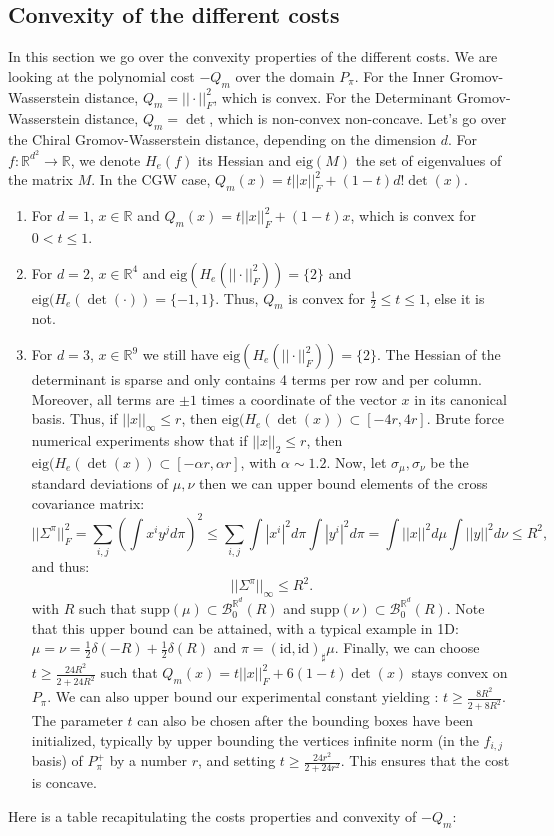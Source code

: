 \documentclass{article}
\newcommand{\R}{\mathbb{R}}
\newcommand{\B}{\mathcal{B}}
\newcommand{\1}{\mathbf{1}}
\newcommand{\eig}{\mathrm{eig}}
\theoremstyle{definition}
\theoremstyle{remark}
\begin{document}
\begin{appendices}
\section{Convexity of the different costs}\label{sec:supp_cost_convexity}
In this section we go over the convexity properties of the different costs. We are looking at the polynomial cost $-Q_m$ over the domain $P_\pi$. For the Inner Gromov-Wasserstein distance, $Q_m =||\cdot||^2_F $, which is convex. For the Determinant Gromov-Wasserstein distance, $Q_m =\det $, which is non-convex non-concave. Let's go over the Chiral Gromov-Wasserstein distance, depending on the dimension $d$. For $f:\R^{d^2}\to\R$, we denote $H_e(f)$ its Hessian and $\eig(M)$ the set of eigenvalues of the matrix $M$. In the CGW case, $Q_m(x) = t||x||^2_F + (1-t) d! \det(x)$.
\begin{enumerate}
    \item For $d=1$, $x\in \R$ and $Q_m(x) = t||x||^2_F + (1-t) x$, which is convex for $0<t\leq1$.
    \item For $d=2$, $x\in \R^4$ and  $\eig(H_e(||\cdot||^2_F))=\{2\}$ and $\eig(H_e(\det(\cdot))=\{-1,1\}$. Thus, $Q_m$ is convex for $\frac{1}{2}\leq t\leq1$, else it is not.
    \item For $d=3$, $x\in \R^9$ we still have $\eig(H_e(||\cdot||^2_F))=\{2\}$. The Hessian of the determinant is sparse and only contains 4 terms per row and per column. Moreover, all terms are $\pm1$ times a coordinate of the vector $x$ in its canonical basis. Thus, if $||x||_\infty\leq r$, then $\eig(H_e(\det(x))\subset[-4r,4r]$.
    Brute force numerical experiments show that if $||x||_2\leq r$, then $\eig(H_e(\det(x))\subset[-\alpha r,\alpha r]$, with $\alpha \sim 1.2$. 
    Now, let $\sigma_\mu,\sigma_\nu$ be the standard deviations of $\mu,\nu$ then we can upper bound elements of the cross covariance matrix:
    \[||\Sigma^{\pi}||^2_F =\sum_{i,j}\left(\int x^iy^jd\pi\right)^2  \leq\sum_{i,j}\int |x^i|^2d\pi\int |y^i|^2d\pi=\int ||x||^2d\mu\int ||y||^2d\nu\leq R^2,\]
    and thus:
    \[||\Sigma^\pi||_\infty\leq R^2.\]
     with $R$ such that $\mathrm{supp}(\mu)\subset \B_0^{\R^d}(R)$ and $\mathrm{supp}(\nu)\subset \B_0^{\R^d}(R)$.
    Note that this upper bound can be attained, with a typical example in 1D: $\mu=\nu=\frac{1}{2}\delta(-R)+ \frac{1}{2}\delta(R)$ and $\pi = (\textrm{id}, \textrm{id})_\sharp \mu$.
    Finally, we can choose $t \geq \frac{24R^2}{2+24R^2} $ such that $Q_m(x)=t||x||^2_F + 6 (1-t) \det(x)$ stays convex on $P_\pi$. 
    We can also upper bound our experimental constant yielding : $t \geq \frac{8R^2}{2+8R^2} $. The parameter $t$ can also be chosen after the bounding boxes have been initialized, typically by upper bounding the vertices infinite norm (in the $f_{i,j}$ basis) of $P_\pi^+$ by a number $r$, and setting $t\geq \frac{24r^2}{2+24r^2}$. This ensures that the cost is concave.
\end{enumerate}
Here is a table recapitulating the costs properties and convexity of $-Q_m$:


\end{appendices}
\end{document}
